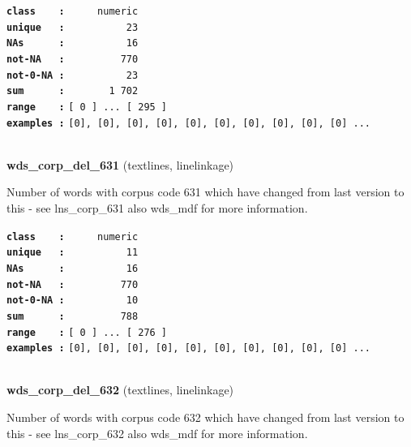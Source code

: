 \documentclass[]{article}
\begin{document}
\textbf{\texttt{class\ \ \ \ :}} \texttt{~~~~~numeric}\\
\textbf{\texttt{unique\ \ \ :}} \texttt{~~~~~~~~~~23}\\
\textbf{\texttt{NAs\ \ \ \ \ \ :}} \texttt{~~~~~~~~~~16}\\
\textbf{\texttt{not-NA\ \ \ :}} \texttt{~~~~~~~~~770}\\
\textbf{\texttt{not-0-NA\ :}} \texttt{~~~~~~~~~~23}\\
\textbf{\texttt{sum\ \ \ \ \ \ :}} \texttt{~~~~~~~1~702}\\
\textbf{\texttt{range\ \ \ \ :}}
\texttt{{[}\ 0\ {]}\ ...\ {[}\ 295\ {]}}\\
\textbf{\texttt{examples\ :}}
\texttt{{[}0{]},\ {[}0{]},\ {[}0{]},\ {[}0{]},\ {[}0{]},\ {[}0{]},\ {[}0{]},\ {[}0{]},\ {[}0{]},\ {[}0{]}\ ...}\\

~

\textbf{wds\_corp\_del\_631} (textlines, linelinkage)

Number of words with corpus code 631 which have changed from last
version to this - see lns\_corp\_631 also wds\_mdf for more information.

\textbf{\texttt{class\ \ \ \ :}} \texttt{~~~~~numeric}\\
\textbf{\texttt{unique\ \ \ :}} \texttt{~~~~~~~~~~11}\\
\textbf{\texttt{NAs\ \ \ \ \ \ :}} \texttt{~~~~~~~~~~16}\\
\textbf{\texttt{not-NA\ \ \ :}} \texttt{~~~~~~~~~770}\\
\textbf{\texttt{not-0-NA\ :}} \texttt{~~~~~~~~~~10}\\
\textbf{\texttt{sum\ \ \ \ \ \ :}} \texttt{~~~~~~~~~788}\\
\textbf{\texttt{range\ \ \ \ :}}
\texttt{{[}\ 0\ {]}\ ...\ {[}\ 276\ {]}}\\
\textbf{\texttt{examples\ :}}
\texttt{{[}0{]},\ {[}0{]},\ {[}0{]},\ {[}0{]},\ {[}0{]},\ {[}0{]},\ {[}0{]},\ {[}0{]},\ {[}0{]},\ {[}0{]}\ ...}\\

~

\textbf{wds\_corp\_del\_632} (textlines, linelinkage)

Number of words with corpus code 632 which have changed from last
version to this - see lns\_corp\_632 also wds\_mdf for more information.
\end{document}
